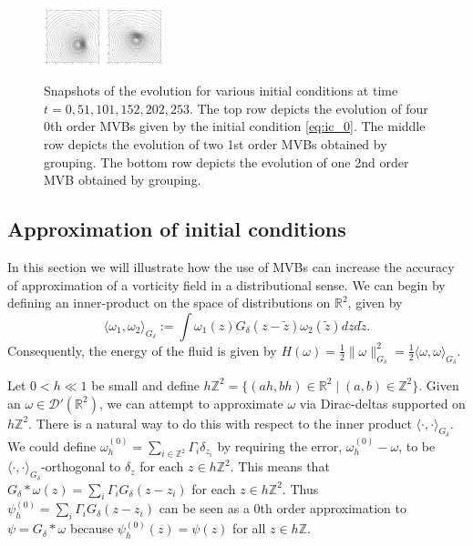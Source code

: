 \documentclass[12pt]{amsart}
\newcommand{\R}{\ensuremath{\mathbb{R}}}
\theoremstyle{remark}
\begin{document}
\begin{figure}[h!]
	\includegraphics[width=0.15\textwidth]{./images/grouping_frames/order_2_time_202}
	\includegraphics[width=0.15\textwidth]{./images/grouping_frames/order_2_time_253}
	\caption{Snapshots of the evolution for various initial conditions at time $t=0,51,101,152,202,253$.
		The top row depicts the evolution of four 0th order MVBs given by the initial condition \eqref{eq:ic_0}.
		The middle row depicts the evolution of two 1st order MVBs obtained by grouping.
		The bottom row depicts the evolution of one 2nd order MVB obtained by grouping.
		}
	\label{fig:grouping}
\end{figure}


\subsection{Approximation of initial conditions}
\label{sec:approximation}
In this section we will illustrate how the use of MVBs can increase the accuracy of approximation of a vorticity field in a distributional sense.
We can begin by defining an inner-product on the space of distributions on $\R^2$, given by
\[
	\langle \omega_1 , \omega_2 \rangle_{G_\delta} := \int \omega_1(z) G_\delta (z - \tilde{z}) \omega_2(\tilde{z}) dz d\tilde{z}.
\]
Consequently, the energy of the fluid is given by $H(\omega) = \frac{1}{2} \|\omega\|^2_{G_\delta} = \frac{1}{2} \langle \omega,\omega\rangle_{G_\delta}$.

Let $0 < h \ll 1$ be small and define $h \mathbb{Z}^2 = \{ (ah,bh) \in \R^2 \mid (a,b) \in \mathbb{Z}^2 \}$.
Given an $\omega \in \mathcal{D}'(\R^2)$, we can attempt to approximate $\omega$ via Dirac-deltas supported on $h \mathbb{Z}^2$.
There is a natural way to do this with respect to the inner product $\langle \cdot , \cdot \rangle_{G_\delta}$.
We could define $\omega_h^{(0)} = \sum_{i \in \mathbb{Z}^2} \Gamma_i \delta_{z_i}$ by requiring the error, $\omega_h^{(0)} - \omega$, to be $\langle \cdot , \cdot \rangle_{G_\delta}$-orthogonal to $\delta_z$ for each $z \in h \mathbb{Z}^2$.
This means that $G_\delta *\omega(z) =  \sum_i \Gamma_i G_\delta (z-z_i)$ for each $z \in h\mathbb{Z}^2$.
Thus $\psi_h^{(0)} = \sum_i \Gamma_i G_\delta (z-z_i)$ can be seen as a $0$th order approximation to $\psi = G_\delta *\omega$
because $\psi_h^{(0)}(z) = \psi(z)$ for all $z \in h\mathbb{Z}$.
 
\end{document}
